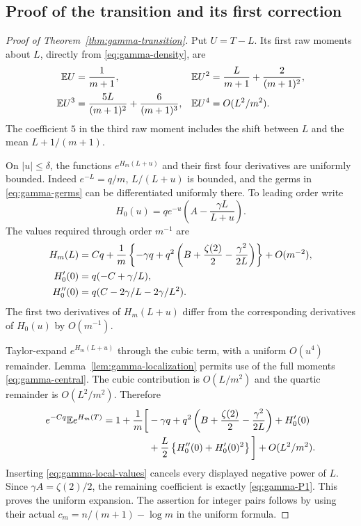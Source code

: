 \subsection{Proof of the transition and its first correction}
\begin{proof}[Proof of Theorem~\ref{thm:gamma-transition}]
Put $U=T-L$. Its first raw moments about $L$, directly from
\eqref{eq:gamma-density}, are
\begin{align}\label{eq:gamma-central}
 \mathbb E U&=\frac1{m+1},&
 \mathbb E U^2&=\frac{L}{m+1}+\frac2{(m+1)^2},\\
 \mathbb E U^3&=\frac{5L}{(m+1)^2}+\frac6{(m+1)^3},&
 \mathbb E U^4&=O(L^2/m^2).\notag
\end{align}
The coefficient $5$ in the third raw moment includes the shift
between $L$ and the mean $L+1/(m+1)$.

On $|u|\le\delta$, the functions $e^{H_m(L+u)}$ and their first
four derivatives are uniformly bounded. Indeed $e^{-L}=q/m$,
$L/(L+u)$ is bounded, and the germs in \eqref{eq:gamma-germs}
can be differentiated uniformly there. To leading order write
\[
 H_0(u)=q e^{-u}\left(A-\frac{\gamma L}{L+u}\right).
\]
The values required through order $m^{-1}$ are
\begin{align}\label{eq:gamma-local-values}
 H_m(L)&=Cq+\frac1m\left\{-\gamma q
       +q^2\left(B+\frac{\zeta(2)}2-\frac{\gamma^2}{2L}\right)\right\}
       +O(m^{-2}),\\
 H_0'(0)&=q(-C+\gamma/L),\notag\\
 H_0''(0)&=q(C-2\gamma/L-2\gamma/L^2).\notag
\end{align}
The first two derivatives of $H_m(L+u)$ differ from the corresponding
derivatives of $H_0(u)$ by $O(m^{-1})$.

Taylor-expand $e^{H_m(L+u)}$ through the cubic term, with a
uniform $O(u^4)$ remainder. Lemma~\ref{lem:gamma-localization}
permits use of the full moments \eqref{eq:gamma-central}. The cubic
contribution is $O(L/m^2)$ and the quartic remainder is
$O(L^2/m^2)$. Therefore
\begin{align*}
 e^{-Cq}\mathbb E e^{H_m(T)}
 =1+\frac1m\bigg[&-\gamma q
 +q^2\left(B+\frac{\zeta(2)}2-\frac{\gamma^2}{2L}\right)
 +H_0'(0)\\
 &+\frac L2\left\{H_0''(0)+H_0'(0)^2\right\}\bigg]
 +O(L^2/m^2).
\end{align*}
Inserting \eqref{eq:gamma-local-values} cancels every displayed
negative power of $L$. Since $\gamma A=\zeta(2)/2$, the remaining
coefficient is exactly \eqref{eq:gamma-P1}. This proves the uniform
expansion. The assertion for integer pairs follows by using their
actual $c_m=n/(m+1)-\log m$ in the uniform formula.
\end{proof}

